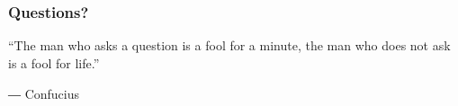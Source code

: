 \documentclass[xcolor=dvipsnames, xcolor=table]{beamer} %
\theoremstyle{mystyle}
\begin{document}
\section*{}

\begin{frame}[fragile] %
\frametitle{Questions?}

\begin{flushleft}“The man who asks a question is a fool for a minute, the man who does not ask is a fool for life.”\end{flushleft}\begin{flushright}
― Confucius
\end{flushright}

\end{frame}
\end{document}
